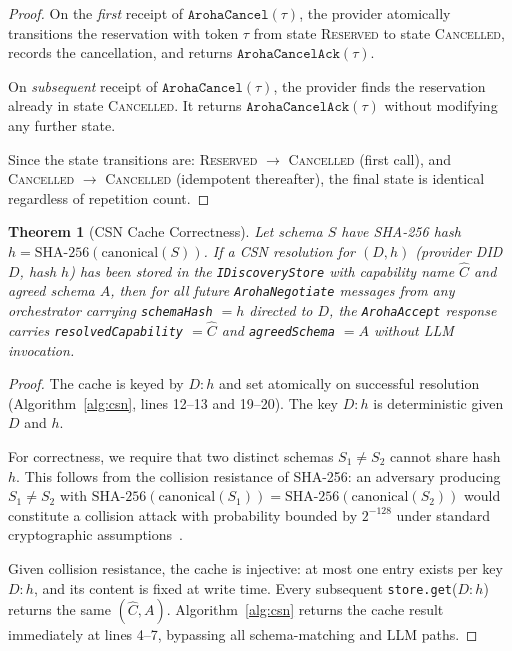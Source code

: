 \documentclass[conference]{IEEEtran}
\newtheorem{theorem}{Theorem}
\begin{document}
\begin{proof}
On the \emph{first} receipt of $\texttt{ArohaCancel}(\tau)$, the
provider atomically transitions the reservation with token $\tau$ from
state \textsc{Reserved} to state \textsc{Cancelled}, records the
cancellation, and returns $\texttt{ArohaCancelAck}(\tau)$.

On \emph{subsequent} receipt of $\texttt{ArohaCancel}(\tau)$, the
provider finds the reservation already in state \textsc{Cancelled}.
It returns $\texttt{ArohaCancelAck}(\tau)$ without modifying any
further state.

Since the state transitions are: \textsc{Reserved} $\to$
\textsc{Cancelled} (first call), and \textsc{Cancelled} $\to$
\textsc{Cancelled} (idempotent thereafter), the final state is
identical regardless of repetition count.
\end{proof}

\begin{theorem}[CSN Cache Correctness]
\label{thm:csn}
Let schema $S$ have SHA-256 hash $h = \text{SHA-256}(\text{canonical}(S))$.
If a CSN resolution for $(D, h)$ (provider DID $D$, hash $h$) has been
stored in the \texttt{IDiscoveryStore} with capability name $\hat{C}$
and agreed schema $A$, then for all future \texttt{ArohaNegotiate}
messages from any orchestrator carrying \texttt{schemaHash} $= h$
directed to $D$, the \texttt{ArohaAccept} response carries
\texttt{resolvedCapability} $= \hat{C}$ and \texttt{agreedSchema} $= A$
without LLM invocation.
\end{theorem}

\begin{proof}
The cache is keyed by $D\!:\!h$ and set atomically on successful
resolution (Algorithm~\ref{alg:csn}, lines 12--13 and 19--20).
The key $D\!:\!h$ is deterministic given $D$ and $h$.

For correctness, we require that two distinct schemas $S_1 \neq S_2$
cannot share hash $h$.  This follows from the collision resistance of
SHA-256: an adversary producing $S_1 \neq S_2$ with
$\text{SHA-256}(\text{canonical}(S_1)) = \text{SHA-256}(\text{canonical}(S_2))$
would constitute a collision attack with probability bounded by
$2^{-128}$ under standard cryptographic assumptions~\cite{keccak2015}.

Given collision resistance, the cache is injective: at most one entry
exists per key $D\!:\!h$, and its content is fixed at write time.
Every subsequent \texttt{store.get}($D\!:\!h$) returns the same
$(\hat{C}, A)$.  Algorithm~\ref{alg:csn} returns the cache result
immediately at lines 4--7, bypassing all schema-matching and LLM
paths.
\end{proof}
\end{document}
